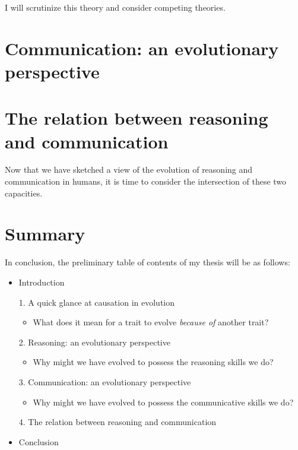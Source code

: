 \documentclass{article}
\begin{document}
I will scrutinize this theory and consider competing theories.

\section{Communication: an evolutionary perspective}

\section{The relation between reasoning and communication}

Now that we have sketched a view of the evolution of reasoning and communication in humans, it is time to consider the intersection of these two capacities.

\section*{Summary}

In conclusion, the preliminary table of contents of my thesis will be as follows:
\begin{itemize}
    \item Introduction
    \item[1.] A quick glance at causation in evolution
        \begin{itemize}
            \item What does it mean for a trait to evolve \emph{because of} another trait?
        \end{itemize}
    \item [2.] Reasoning: an evolutionary perspective
        \begin{itemize}
            \item Why might we have evolved to possess the reasoning skills we do?
        \end{itemize}
    \item [3.] Communication: an evolutionary perspective
        \begin{itemize}
            \item Why might we have evolved to possess the communicative skills we do?
        \end{itemize}
    \item [4.] The relation between reasoning and communication
    \item Conclusion
\end{itemize}

\nocite{*}
\printbibliography[title=Preliminary bibliography]
\end{document}
